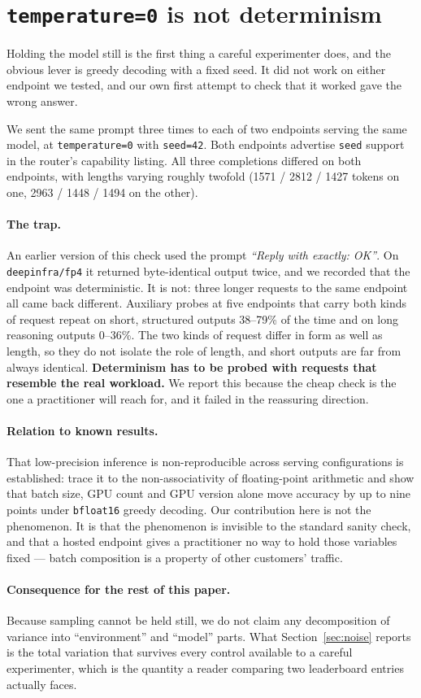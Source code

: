 \section{\texttt{temperature=0} is not determinism}
\label{sec:determinism}

Holding the model still is the first thing a careful experimenter does, and the
obvious lever is greedy decoding with a fixed seed. It did not work on either
endpoint we tested, and our own first attempt to check that it worked gave the
wrong answer.

We sent the same prompt three times to each of two endpoints serving the same
model, at \texttt{temperature=0} with \texttt{seed=42}. Both endpoints
advertise \texttt{seed} support in the router's capability listing. All three
completions differed on both endpoints, with lengths varying roughly twofold
(1571 / 2812 / 1427 tokens on one, 2963 / 1448 / 1494 on the other).

\paragraph{The trap.} An earlier version of this check used the prompt
\emph{``Reply with exactly: OK''}. On \texttt{deepinfra/fp4} it returned
byte-identical output twice, and we recorded that the endpoint was
deterministic. It is not: three longer requests to the same endpoint all came
back different. Auxiliary probes at five endpoints that carry both kinds of
request repeat on short, structured outputs 38--79\% of the time and on long
reasoning outputs 0--36\%. The two kinds of request differ in form as well as
length, so they do not isolate the role of length, and short outputs are far
from always identical. \textbf{Determinism has to be probed with requests that
resemble the real workload.} We report this because the cheap check is the one
a practitioner will reach for, and it failed in the reassuring direction.

\paragraph{Relation to known results.} That low-precision inference is
non-reproducible across serving configurations is established:
\citet{yuan2025nondeterminism} trace it to the non-associativity of
floating-point arithmetic and show that batch size, GPU count and GPU version
alone move accuracy by up to nine points under \texttt{bfloat16} greedy
decoding. Our contribution here is not the phenomenon. It is that the
phenomenon is invisible to the standard sanity check, and that a hosted
endpoint gives a practitioner no way to hold those variables fixed --- batch
composition is a property of other customers' traffic.

\paragraph{Consequence for the rest of this paper.} Because sampling cannot be
held still, we do not claim any decomposition of variance into
``environment'' and ``model'' parts. What Section~\ref{sec:noise} reports is
the total variation that survives every control available to a careful
experimenter, which is the quantity a reader comparing two leaderboard entries
actually faces.
